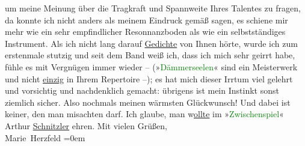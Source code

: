                um meine Meinung über die Tragkraft und Spannweite Ihres Talentes zu fragen, da
               konnte ich nicht anders als meinem {\pb}Eindruck gemäß sagen,
               es schiene mir mehr wie ein sehr empfindlicher Resonnanzboden als wie ein
               selbstständiges Instrument. Als ich nicht lang darauf \uline{Gedichte} von Ihnen hörte, wurde ich zum erstenmale stutzig und seit dem Band
                  \label{K_L02592-3v}\label{K_L02592-3h} weiß ich, dass ich mich sehr geirrt habe, fühle es mit
               Vergnügen immer wieder – (»\textcolor{green}{Dämmerseelen}{}\ledrightnote{\textcolor{green}{Dämmerseelen. Novellen}}« sind ein
               Meisterwerk und nicht \uline{einzig} in Ihrem Repertoire –);
               es hat mich {\pb}dieser Irrtum viel gelehrt und vorsichtig und
               nachdenklich gemacht: übrigens ist mein Instinkt sonst ziemlich sicher.\pend
           \pstart
           Also nochmals meinen wärmsten Glückwunsch! Und dabei ist \label{K_L02592-4v}\label{K_L02592-4h} keiner, den
               man misachten darf. Ich glaube, man w\uline{ollte} im »\textcolor{green}{Zwischenspiel}{}\ledrightnote{\textcolor{green}{Zwischenspiel. Komödie in drei Akten}}« Arthur \uline{Schnitzler} ehren.\pend
           \pstart
           Mit vielen Grüßen, {\\[\baselineskip]}\spacefill\mbox{Marie Herzfeld}\pend
           \leftskip=0em{}\endnumbering{}  
      